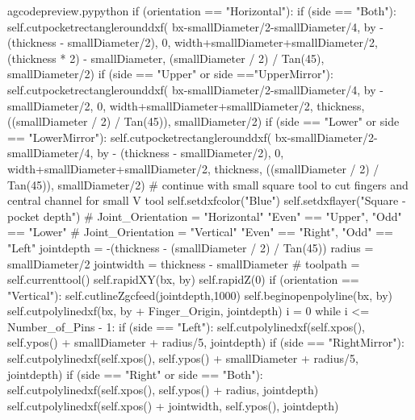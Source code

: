 \documentclass{ltxdoc}
\begin{document}
\begin{writecode}{a}{gcodepreview.py}{python}
        if (orientation == "Horizontal"):
            if (side == "Both"):
                self.cutpocketrectanglerounddxf(
                    bx-smallDiameter/2-smallDiameter/4, 
                    by - (thickness - smallDiameter/2), 
                    0, 
                    width+smallDiameter+smallDiameter/2, 
                    (thickness * 2) - smallDiameter, 
                    (smallDiameter / 2) / Tan(45), 
                    smallDiameter/2)
            if (side == "Upper" or side =="UpperMirror"):
                self.cutpocketrectanglerounddxf(
                    bx-smallDiameter/2-smallDiameter/4, 
                    by - smallDiameter/2, 
                    0, 
                    width+smallDiameter+smallDiameter/2, 
                    thickness, 
                    ((smallDiameter / 2) / Tan(45)), 
                    smallDiameter/2)
            if (side == "Lower" or side == "LowerMirror"):
                self.cutpocketrectanglerounddxf(
                    bx-smallDiameter/2-smallDiameter/4, 
                    by - (thickness - smallDiameter/2), 
                    0, 
                    width+smallDiameter+smallDiameter/2, 
                    thickness, 
                    ((smallDiameter / 2) / Tan(45)), 
                    smallDiameter/2)
    # continue with small square tool to cut fingers and central channel for small V tool
        self.setdxfcolor("Blue")
        self.setdxflayer("Square - pocket depth")
    # Joint_Orientation = "Horizontal" "Even" == "Upper", "Odd" == "Lower"
    # Joint_Orientation = "Vertical" "Even" == "Right", "Odd" == "Left"
        jointdepth = -(thickness - (smallDiameter / 2) / Tan(45))
        radius = smallDiameter/2
        jointwidth = thickness - smallDiameter
    #    toolpath = self.currenttool()
        self.rapidXY(bx, by)
        self.rapidZ(0)
        if (orientation == "Vertical"):
            self.cutlineZgcfeed(jointdepth,1000)
            self.beginopenpolyline(bx, by)
            self.cutpolylinedxf(bx, by + Finger_Origin, jointdepth)
            i = 0
            while i <= Number_of_Pins - 1:
                if (side == "Left"):
                    self.cutpolylinedxf(self.xpos(), self.ypos() + smallDiameter + radius/5, jointdepth)
                if (side == "RightMirror"):
                    self.cutpolylinedxf(self.xpos(), self.ypos() + smallDiameter + radius/5, jointdepth)
                if (side == "Right" or side == "Both"):
                    self.cutpolylinedxf(self.xpos(), self.ypos() + radius, jointdepth)
                    self.cutpolylinedxf(self.xpos() + jointwidth, self.ypos(), jointdepth)

\end{writecode}
\end{document}
